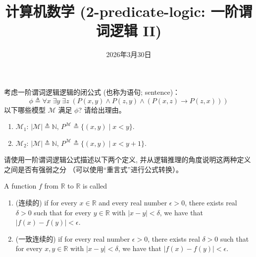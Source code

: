 \documentclass[a4paper, justified]{tufte-handout}
\title{计算机数学 (2-predicate-logic: 一阶谓词逻辑 II)}
\date{2026年3月30日}
\begin{document}
\maketitle
\noplagiarism %
\begin{abstract}
\end{abstract}
\beginrequired

\begin{problem}
  考虑一阶谓词逻辑逻辑的闭公式 (也称为语句; sentence)：
  \[
    \phi \triangleq \forall x\; \exists y\; \exists z\;
      (P(x, y) \land P(z, y) \land (P(x, z) \to P(z, x)))
  \]
  以下哪些模型 $\mathcal{M}$ 满足 $\phi$? 请给出理由。
  \begin{enumerate}[(1)]
    \item $\mathcal{M}_{1}$:
      $|\mathcal{M}| \triangleq \mathbb{N}$,
      $P^{\mathcal{M}} \triangleq \{(x, y) \mid x < y\}$.
    \item $\mathcal{M}_{2}$:
      $|\mathcal{M}| \triangleq \mathbb{N}$,
      $P^{\mathcal{M}} \triangleq \{(x, y) \mid x < y + 1\}$.
  \end{enumerate}
\end{problem}

\begin{solution}
\end{solution}

\begin{problem}
  请使用一阶谓词逻辑公式描述以下两个定义,
  并从逻辑推理的角度说明这两种定义之间是否有强弱之分
  （可以使用``重言式''进行公式转换）。

  A function $f$ from $\mathbb{R}$ to $\mathbb{R}$ is called
  \begin{enumerate}[(1)]
    \setlength{\itemsep}{10pt}
    \item {} (连续的) if
      for every $x \in \mathbb{R}$
      and every real number $\epsilon > 0$,
      there exists real $\delta > 0$ such that
      for every $y \in \mathbb{R}$ with $|x - y| < \delta$,
      we have that $|f(x) -  f(y)|< \epsilon$.
    \item {} (一致连续的) if
      for every real number $\epsilon > 0$,
      there exists real $\delta > 0$ such that
      for every $x, y \in \mathbb{R}$ with $|x - y| < \delta$,
      we have that $|f(x) -  f(y)|< \epsilon$.
  \end{enumerate}
\end{problem}
\end{document}

